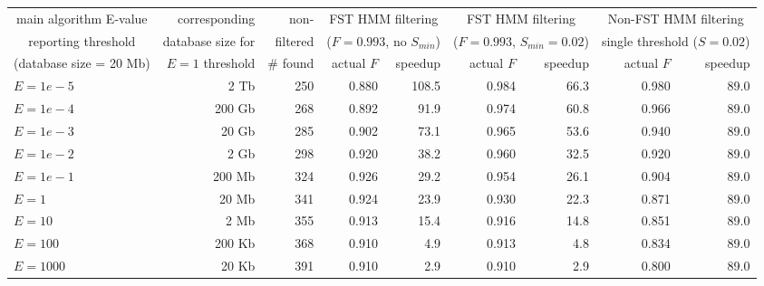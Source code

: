 \begin{tabular}{lrr|rr|rr|rr} 
\multicolumn{1}{c}{main algorithm E-value}  & corresponding       & non-     & \multicolumn{2}{c|}{FST HMM filtering}         & \multicolumn{2}{c|}{FST HMM filtering}           & \multicolumn{2}{c}{Non-FST HMM filtering} \\
\multicolumn{1}{c}{reporting threshold}     & database size for   & filtered & \multicolumn{2}{c|}{($F=0.993$, no $S_{min}$)} & \multicolumn{2}{c|}{($F=0.993$, $S_{min}=0.02$)} & \multicolumn{2}{c}{single threshold ($S=0.02$)} \\ \cline{4-9}
\multicolumn{1}{c}{(database size = 20 Mb)} & $E=1$ threshold     & \# found & actual $F$& speedup                            & actual $F$& speedup                              &actual $F$& speedup            \\\hline                    
  $E=1e-5$                                    &             2 Tb    & 250      & 0.880 &  108.5                             & 0.984     &  66.3                                & 0.980    & 89.0 \\
  $E=1e-4$                                    &           200 Gb    & 268      & 0.892 &   91.9                             & 0.974     &  60.8                                & 0.966    & 89.0 \\
  $E=1e-3$                                    &            20 Gb    & 285      & 0.902 &   73.1                             & 0.965     &  53.6                                & 0.940    & 89.0 \\
  $E=1e-2$                                    &             2 Gb    & 298      & 0.920 &   38.2                             & 0.960     &  32.5                                & 0.920    & 89.0 \\
  $E=1e-1$                                    &           200 Mb    & 324      & 0.926 &   29.2                             & 0.954     &  26.1                                & 0.904    & 89.0 \\
  $E=1$                                    &            20 Mb    & 341      & 0.924 &   23.9                             & 0.930     &  22.3                                & 0.871    & 89.0 \\
  $E=10$                                    &             2 Mb    & 355      & 0.913 &   15.4                             & 0.916     &  14.8                                & 0.851    & 89.0 \\
  $E=100$                                    &           200 Kb    & 368      & 0.910 &    4.9                             & 0.913     &   4.8                                & 0.834    & 89.0 \\
  $E=1000$                                    &            20 Kb    & 391      & 0.910 &    2.9                             & 0.910     &   2.9                                & 0.800    & 89.0 \\
\end{tabular}


